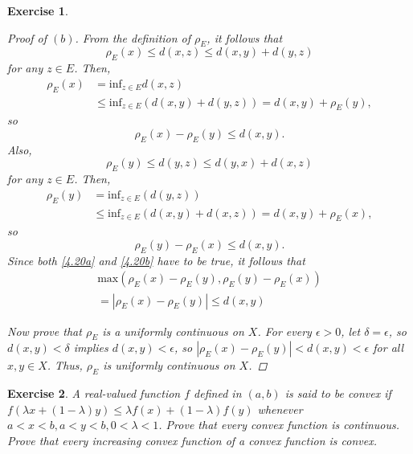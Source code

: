 \documentclass[10pt,letterpaper]{amsart}
\newtheorem{exercise}{Exercise}[section]
\theoremstyle{definition}
\theoremstyle{remark}
\numberwithin{equation}{exercise}
\begin{document}
\begin{multicols}{2}
\begin{exercise}
    \begin{proof}[Proof of $(b)$]
      From the definition of $\rho_E$, it follows that
      \begin{equation*}
        \rho_E(x) \le d(x,z) \le d(x,y) + d(y,z)
      \end{equation*}
      for any $z \in E$. Then,
      \begin{align*}
        \rho_E(x) &= \mathrm{inf}_{z \in E} d(x,z)\\
        &\le \mathrm{inf}_{z \in E} (d(x,y)+d(y,z)) = d(x,y) + \rho_E(y),
      \end{align*}
      so
      \begin{equation}\label{4.20a}
        \rho_E(x) - \rho_E(y) \le d(x,y).
      \end{equation}
      Also,
      \begin{equation*}
        \rho_E(y) \le d(y,z) \le d(y,x) + d(x,z)
      \end{equation*}
      for any $z \in E$. Then,
      \begin{align*}
        \rho_E(y) &= \mathrm{inf}_{z \in E}(d(y,z))\\
        &\le \mathrm{inf}_{z \in E}(d(x,y)+d(x,z)) = d(x,y) + \rho_E(x),
      \end{align*}
      so
      \begin{equation}\label{4.20b}
        \rho_E(y) - \rho_E(x) \le d(x,y).
      \end{equation}
      Since both \eqref{4.20a} and \eqref{4.20b} have to be true, it follows that
      \begin{multline*}
        \mathrm{max}\left( \rho_E(x) - \rho_E(y),\rho_E(y) - \rho_E(x)\right)\\
        = |\rho_E(x) - \rho_E(y)| \le d(x,y)
      \end{multline*}
      \par Now prove that $\rho_E$ is a uniformly continuous on $X$. For every $\epsilon > 0$, let $\delta = \epsilon$, so $d(x,y) < \delta$ implies $d(x,y) < \epsilon$, so $|\rho_E(x) - \rho_E(y)| < d(x,y) < \epsilon$ for all $x,y \in X$. Thus, $\rho_E$ is uniformly continuous on $X$.
    \end{proof}
  \end{exercise}
  \setcounter{exercise}{22}
  \begin{exercise}\label{4.23}
    A real-valued function $f$ defined in $(a,b)$ is said to be \emph{convex} if $f(\lambda x + (1-\lambda)y) \le \lambda f(x) + (1-\lambda)f(y)$ whenever $a < x < b, a < y < b, 0 < \lambda < 1$. Prove that every convex function is continuous. Prove that every increasing convex function of a convex function is convex.

\end{exercise}
\end{multicols}
\end{document}
